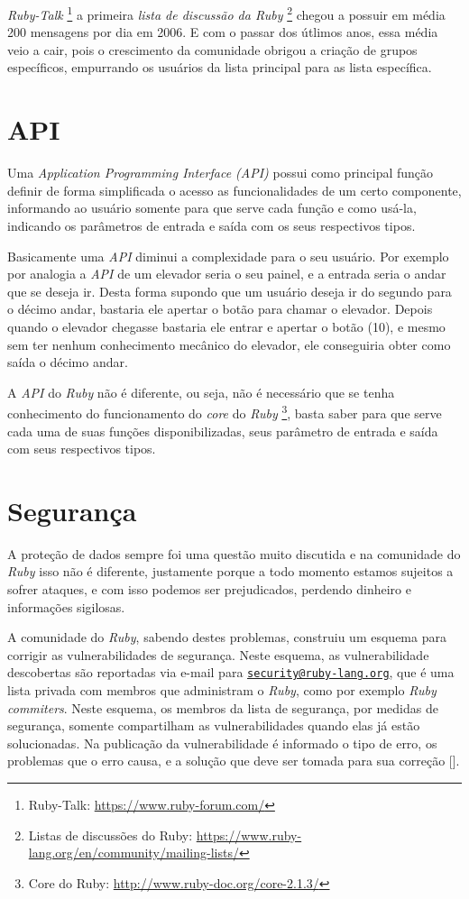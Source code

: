\emph{Ruby-Talk} \footnote{Ruby-Talk: \url{https://www.ruby-forum.com/}} a primeira \emph{lista de
discussão da Ruby} \footnote{Listas de discussões do Ruby:
\url{https://www.ruby-lang.org/en/community/mailing-lists/}} chegou a possuir em média 200 mensagens por dia
em 2006. E com o passar dos útlimos anos, essa média veio a cair, pois o crescimento da comunidade
obrigou a criação de grupos específicos, empurrando os usuários da lista principal para as lista específica.


\section{API}
\label{section:API_ruby}

Uma \emph{Application Programming Interface (API)} possui como principal função definir de forma simplificada
o acesso as funcionalidades de um certo componente, informando ao usuário somente para que serve cada função
e como usá-la, indicando os parâmetros de entrada e saída com os seus respectivos tipos.

Basicamente uma \emph{API} diminui a complexidade para o seu usuário. Por exemplo por analogia a \emph{API}
de um elevador seria o seu painel, e a entrada seria o andar que se deseja ir. Desta forma supondo que
um usuário deseja ir do segundo para o décimo andar, bastaria ele apertar o botão para chamar o
elevador. Depois quando o elevador chegasse bastaria ele entrar e apertar o botão (10), e mesmo sem ter
nenhum conhecimento mecânico do elevador, ele conseguiria obter como saída o décimo andar.

A \emph{API} do \emph{Ruby} não é diferente, ou seja, não é necessário que se tenha
conhecimento do funcionamento do \emph{core} do \emph{Ruby}
\footnote{ Core do Ruby: \url{http://www.ruby-doc.org/core-2.1.3/}}, basta saber para que
serve cada uma de suas funções disponibilizadas, seus parâmetro de entrada e saída com seus respectivos tipos.

\section{Segurança}
\label{section:segurança_ruby}

A proteção de dados sempre foi uma questão muito discutida e na comunidade do \emph{Ruby} isso não é
diferente, justamente porque a todo momento estamos sujeitos a sofrer ataques, e com isso podemos ser
prejudicados, perdendo dinheiro e informações sigilosas.

A comunidade do \emph{Ruby}, sabendo destes problemas, construiu um esquema para corrigir as
vulnerabilidades de segurança. Neste esquema, as vulnerabilidade descobertas são reportadas via e-mail para
\href{mailto:security@ruby-lang.org}{\nolinkurl{security@ruby-lang.org}}, que é uma lista privada com
membros que administram o \emph{Ruby}, como por exemplo \emph{Ruby commiters}. Neste esquema, os membros da
lista de segurança, por medidas de segurança, somente compartilham as vulnerabilidades quando elas já estão
solucionadas. Na publicação da vulnerabilidade é informado o tipo de erro, os problemas que o erro causa,
e a solução que deve ser tomada para sua correção [].

